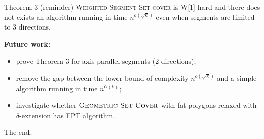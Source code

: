 \documentclass{beamer}
\begin{document}
\begin{frame}
\begin{block}{Theorem 3 (reminder)}
	\textsc{Weighted Segment Set cover} is W[1]-hard
	and there does not exists an algorithm running in time $n^{o(\sqrt{k})}$
	even when segments are limited to 3 directions.
\end{block}
\bigskip

\textbf{Future work:}
\begin{itemize}
\item prove Theorem 3 for axis-parallel segments (2 directions);
\item remove the gap between the lower bound of complexity $n^{o(\sqrt{k})}$
and a simple algorithm running in time $n^{\mathcal{O}(k)}$;
\item investigate whether $\textsc{Geometric Set Cover}$ 
with fat polygons relaxed with $\delta$-extension has FPT algorithm.
\end{itemize}
\end{frame}

\begin{frame}
\begin{center}
The end.
\end{center}
\end{frame}

\end{document}
